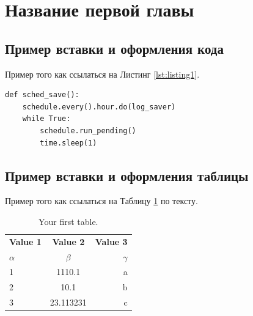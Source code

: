 \section{Название первой главы}

\subsection{Пример вставки и оформления кода}
Пример того как ссылаться на Листинг \ref{lst:listing1}.

\begin{lstlisting}[caption=Использование schedule в коде, label=lst:listing1]
def sched_save():
    schedule.every().hour.do(log_saver)
    while True:
        schedule.run_pending()
        time.sleep(1)
\end{lstlisting}

\subsection{Пример вставки и оформления таблицы}
Пример того как ссылаться на Таблицу \ref{tab:table1} по тексту.

\begin{table}[h!]
  \begin{center}
    \caption{Your first table.}
    \label{tab:table1}
    \begin{tabular}{l|c|r} %
      \textbf{Value 1} & \textbf{Value 2} & \textbf{Value 3}\\
      $\alpha$ & $\beta$ & $\gamma$ \\
      \hline
      1 & 1110.1 & a\\
      2 & 10.1 & b\\
      3 & 23.113231 & c\\
    \end{tabular}
  \end{center}
\end{table}
